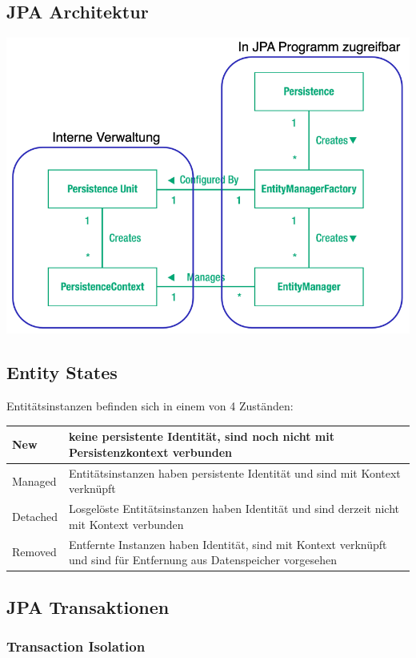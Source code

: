 \documentclass[a4paper, landscape, 8pt]{scrartcl}
\begin{document}
\begin{multicols*}{4}
        \subsection{JPA Architektur}
        \includegraphics[scale=0.15]{graphic/01-jpa-architecture}

        \subsection{Entity States}
        Entitätsinstanzen befinden sich in einem von 4 Zuständen: \\
        \begin{tabularx}{\columnwidth}{l | X}
            New & keine persistente Identität, sind noch nicht mit Persistenzkontext verbunden\\
            \hline
            Managed & Entitätsinstanzen haben persistente Identität und sind mit Kontext verknüpft\\
            \hline
            Detached & Losgelöste Entitätsinstanzen haben Identität und sind derzeit nicht mit Kontext verbunden\\
            \hline
            Removed & Entfernte Instanzen haben Identität, sind mit Kontext verknüpft und sind für Entfernung aus Datenspeicher vorgesehen
        \end{tabularx}

        \subsection{JPA Transaktionen}

        \subsubsection{Transaction Isolation}


\end{multicols*}
\end{document}
